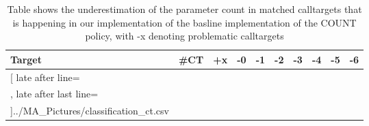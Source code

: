 \begin{wraptable}{r}{0pt}
	\begin{tabular}{l|c|c|c|c|c|c|c|c|c}%
	\toprule
	\bfseries Target & \bfseries \#CT & \bfseries +x & \bfseries -0 & \bfseries -1 & \bfseries -2 & \bfseries -3 & \bfseries -4 & \bfseries -5 & \bfseries -6 %
	\\\midrule
	\csvreader[ late after line=\\, late after last line=\\\bottomrule]{../MA_Pictures/classification_ct.csv}{
	}
	{\csvcoli & \csvcoliii & \csvcoliv & \csvcolv & \csvcolvi & \csvcolvii & \csvcolviii & \csvcolix & \csvcolx & \csvcolxi}%
    	\end{tabular}
		\caption {Table shows the underestimation of the parameter count in matched calltargets that is happening in our implementation of the basline implementation of the COUNT policy, with -x denoting problematic calltargets}
	\label{tbl:baselinect}
\end{wraptable}



\begin{table}
		\caption {Table shows the ability of inferring the parameter count for callsites and calltargets exhibited by our implementation of the COUNT policy. }
	\label{tbl:baselinecompcsct}
\end{table}


